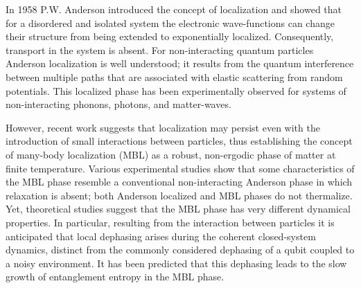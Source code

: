 In 1958 P.W. Anderson introduced the concept of localization
and showed that for a disordered and isolated system the electronic wave-functions can change their structure from being extended to exponentially localized.
Consequently, transport in the system is absent. %
For non-interacting quantum particles Anderson localization is well understood;
it results from the quantum interference between multiple paths that are associated with elastic scattering from random potentials.
This localized phase has been experimentally observed for systems of non-interacting phonons, photons, and matter-waves.\autocite{Billy2008, Weaver1990, Wiersma1997, Schwartz2007} %

However, recent work suggests that localization may persist even with the introduction of small interactions between particles,
thus establishing the concept of many-body localization (MBL) as a robust, non-ergodic phase of matter at finite temperature.\autocite{Basko2006, Gornyi2005, ImbriePRL2016}
Various experimental studies show that some characteristics of the MBL phase resemble a conventional non-interacting Anderson phase in which relaxation is absent\autocite{BlochMBL2015, demarco2015, Monroe2015, GrossScience2016, Bordia2017, Roushan2018, Lukin2019};
both Anderson localized and MBL phases do not thermalize.
Yet, theoretical studies suggest that the MBL phase has very different dynamical properties.\autocite{Huse2007, Bardarson2012, Huse2014, Serbyn2013, Antonello2017, Serbyn2014, Yasaman2015,  Gopalakrishnan2015, Serbyn2015, ImbriePRL2016}
In particular, resulting from the interaction between particles it is anticipated that local dephasing arises during the coherent closed-system dynamics, distinct from the commonly considered dephasing of a qubit coupled to a noisy environment.
It has been predicted that this dephasing leads to the slow growth of entanglement entropy in the MBL phase.

\afterpage{\FloatBarrier}

